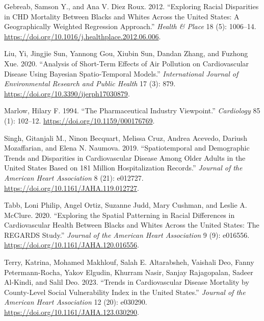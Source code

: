 \documentclass[
]{article}
\newlength{\cslhangindent}
\newenvironment{CSLReferences}[2] %
 {\begin{list}{}{%
  \setlength{\itemindent}{0pt}
  \setlength{\leftmargin}{0pt}
  \setlength{\parsep}{0pt}
  \ifodd #1
   \setlength{\leftmargin}{\cslhangindent}
   \setlength{\itemindent}{-1\cslhangindent}
  \fi
  \setlength{\itemsep}{#2\baselineskip}}}
 {\end{list}}
\begin{document}
\label{refs}
\begin{CSLReferences}{1}{0}
Gebreab, Samson Y., and Ana V. Diez Roux. 2012. {``Exploring Racial
Disparities in {CHD} Mortality Between Blacks and Whites Across the
{United} {States}: {A} Geographically Weighted Regression Approach.''}
\emph{Health \& Place} 18 (5): 1006--14.
\url{https://doi.org/10.1016/j.healthplace.2012.06.006}.

Liu, Yi, Jingjie Sun, Yannong Gou, Xiubin Sun, Dandan Zhang, and Fuzhong
Xue. 2020. {``Analysis of {Short}-{Term} {Effects} of {Air} {Pollution}
on {Cardiovascular} {Disease} {Using} {Bayesian} {Spatio}-{Temporal}
{Models}.''} \emph{International Journal of Environmental Research and
Public Health} 17 (3): 879.
\url{https://doi.org/10.3390/ijerph17030879}.

Marlow, Hilary F. 1994. {``The Pharmaceutical Industry Viewpoint.''}
\emph{Cardiology} 85 (1): 102--12.
\url{https://doi.org/10.1159/000176769}.

Singh, Gitanjali M., Ninon Becquart, Melissa Cruz, Andrea Acevedo,
Dariush Mozaffarian, and Elena N. Naumova. 2019. {``Spatiotemporal and
{Demographic} {Trends} and {Disparities} in {Cardiovascular} {Disease}
{Among} {Older} {Adults} in the {United} {States} {Based} on 181
{Million} {Hospitalization} {Records}.''} \emph{Journal of the American
Heart Association} 8 (21): e012727.
\url{https://doi.org/10.1161/JAHA.119.012727}.

Tabb, Loni Philip, Angel Ortiz, Suzanne Judd, Mary Cushman, and Leslie
A. McClure. 2020. {``Exploring the {Spatial} {Patterning} in {Racial}
{Differences} in {Cardiovascular} {Health} {Between} {Blacks} and
{Whites} {Across} the {United} {States}: {The} {REGARDS} {Study}.''}
\emph{Journal of the American Heart Association} 9 (9): e016556.
\url{https://doi.org/10.1161/JAHA.120.016556}.

Terry, Katrina, Mohamed Makhlouf, Salah E. Altarabsheh, Vaishali Deo,
Fanny Petermann-Rocha, Yakov Elgudin, Khurram Nasir, Sanjay Rajagopalan,
Sadeer Al-Kindi, and Salil Deo. 2023. {``Trends in {Cardiovascular}
{Disease} {Mortality} by {County}-{Level} {Social} {Vulnerability}
{Index} in the {United} {States}.''} \emph{Journal of the American Heart
Association} 12 (20): e030290.
\url{https://doi.org/10.1161/JAHA.123.030290}.


\end{CSLReferences}
\end{document}

